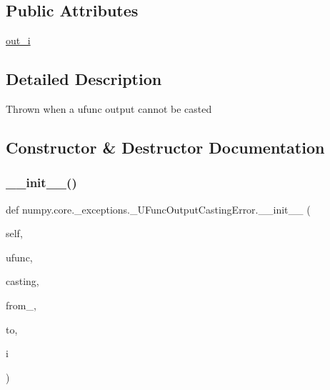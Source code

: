 \subsection*{Public Attributes}
\begin{DoxyCompactItemize}
\item 
\hyperlink{classnumpy_1_1core_1_1__exceptions_1_1__UFuncOutputCastingError_aacf627f5a785d7f233f23836169c8adb}{out\+\_\+i}
\end{DoxyCompactItemize}


\subsection{Detailed Description}
\begin{DoxyVerb}Thrown when a ufunc output cannot be casted \end{DoxyVerb}
 

\subsection{Constructor \& Destructor Documentation}
\mbox{\label{classnumpy_1_1core_1_1__exceptions_1_1__UFuncOutputCastingError_a890ecc362bac4dd2d0d8e4dba2b2a39a}} 
\subsubsection{\texorpdfstring{\+\_\+\+\_\+init\+\_\+\+\_\+()}{\_\_init\_\_()}}
{\footnotesize\ttfamily def numpy.\+core.\+\_\+exceptions.\+\_\+\+U\+Func\+Output\+Casting\+Error.\+\_\+\+\_\+init\+\_\+\+\_\+ (\begin{DoxyParamCaption}\item[{}]{self,  }\item[{}]{ufunc,  }\item[{}]{casting,  }\item[{}]{from\+\_\+,  }\item[{}]{to,  }\item[{}]{i }\end{DoxyParamCaption})}



